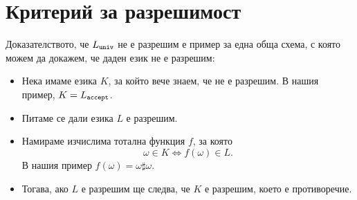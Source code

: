 \section{Критерий за разрешимост}


\begin{framed}
  Доказателството, че $L_{\texttt{univ}}$ не е разрешим е пример за една обща схема, с която можем да докажем, че даден език не е разрешим:
  \begin{itemize}
  \item 
    Нека имаме езика $K$, за който вече знаем, че не е разрешим.
    В нашия пример, $K = L_{\texttt{accept}}$.
  \item
    Питаме се дали езика $L$ е разрешим.
  \item
    Намираме изчислима тотална функция $f$, за която
    \[\omega \in K \iff f(\omega) \in L.\]
    В нашия пример $f(\omega) = \omega \sharp \omega$.
  \item
    Тогава, ако $L$ е разрешим ще следва, че $K$ е разрешим, което е противоречие.
  \end{itemize}
\end{framed}

